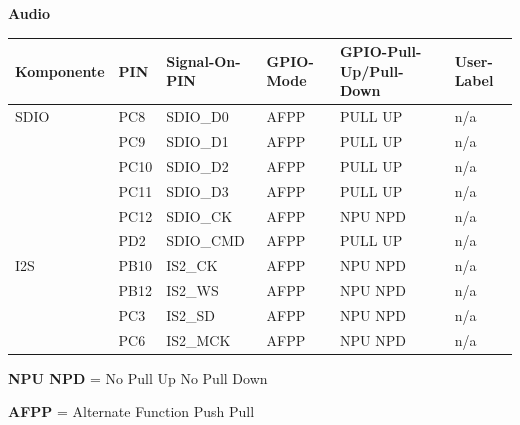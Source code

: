 \textbf{Audio}
\begin{longtable}[c]{|p{2.5cm}|p{1cm}|p{2.5cm}|p{2.5cm}|p{2.5cm}|p{3cm}|}
	\hline
	\textbf{Komponente} & \textbf{PIN} & \textbf{Signal-On-PIN} &  \textbf{GPIO-Mode} & \textbf{GPIO-Pull-Up/Pull-Down } & \textbf{User-Label}\\
	\hline
	SDIO & PC8 & SDIO\_D0 & AFPP & PULL UP & n/a \\
	\hline
	& PC9 & SDIO\_D1 & AFPP & PULL UP & n/a \\
	\hline
	& PC10 & SDIO\_D2 & AFPP & PULL UP & n/a \\
	\hline
	& PC11 & SDIO\_D3 & AFPP & PULL UP & n/a \\
	\hline
	& PC12 & SDIO\_CK & AFPP & NPU NPD & n/a \\
	\hline
	& PD2 & SDIO\_CMD & AFPP & PULL UP & n/a \\
	\hline
	I2S & PB10 & IS2\_CK & AFPP  & NPU NPD & n/a \\
	\hline
	& PB12 & IS2\_WS & AFPP & NPU NPD & n/a \\
	\hline
	& PC3 & IS2\_SD & AFPP & NPU NPD &  n/a \\
	\hline
	& PC6 & IS2\_MCK & AFPP & NPU NPD &  n/a \\
	\hline
\end{longtable}

\textbf{NPU NPD} = No Pull Up No Pull Down		

\textbf{AFPP} = Alternate Function Push Pull 

